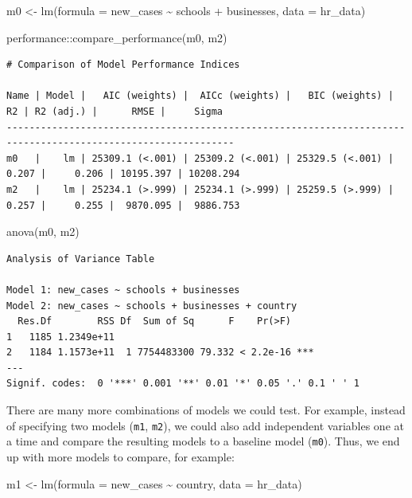 \documentclass[
  letterpaper,
]{krantz}
\makeatletter
\newenvironment{Shaded}{\begin{snugshade}}{\end{snugshade}}
\newcommand{\AttributeTok}[1]{\textcolor[rgb]{0.40,0.45,0.13}{#1}}
\newcommand{\FunctionTok}[1]{\textcolor[rgb]{0.28,0.35,0.67}{#1}}
\newcommand{\NormalTok}[1]{\textcolor[rgb]{0.00,0.23,0.31}{#1}}
\newcommand{\OtherTok}[1]{\textcolor[rgb]{0.00,0.23,0.31}{#1}}
\newcommand{\SpecialCharTok}[1]{\textcolor[rgb]{0.37,0.37,0.37}{#1}}
\newenvironment{kframe}{%
\medskip{}
\setlength{\fboxsep}{.8em}
 \def\at@end@of@kframe{}%
 \ifinner\ifhmode%
  \def\at@end@of@kframe{\end{minipage}}%
  \begin{minipage}{\columnwidth}%
 \fi\fi%
 \def\FrameCommand##1{\hskip\@totalleftmargin \hskip-\fboxsep
 \colorbox{shadecolor}{##1}\hskip-\fboxsep
     \hskip-\linewidth \hskip-\@totalleftmargin \hskip\columnwidth}%
 \MakeFramed {\advance\hsize-\width
   \@totalleftmargin\z@ \linewidth\hsize
   \@setminipage}}%
 {\par\unskip\endMakeFramed%
 \at@end@of@kframe}
\renewenvironment{Shaded}{\begin{kframe}}{\end{kframe}}
\makeatother
\begin{document}
\begin{Shaded}
\begin{Highlighting}[]
\NormalTok{m0 }\OtherTok{\textless{}{-}} \FunctionTok{lm}\NormalTok{(}\AttributeTok{formula =}\NormalTok{ new\_cases }\SpecialCharTok{\textasciitilde{}}
\NormalTok{           schools }\SpecialCharTok{+}
\NormalTok{           businesses,}
         \AttributeTok{data =}\NormalTok{ hr\_data)}

\NormalTok{performance}\SpecialCharTok{::}\FunctionTok{compare\_performance}\NormalTok{(m0, m2)}
\end{Highlighting}
\end{Shaded}

\begin{verbatim}
# Comparison of Model Performance Indices

Name | Model |   AIC (weights) |  AICc (weights) |   BIC (weights) |    R2 | R2 (adj.) |      RMSE |     Sigma
--------------------------------------------------------------------------------------------------------------
m0   |    lm | 25309.1 (<.001) | 25309.2 (<.001) | 25329.5 (<.001) | 0.207 |     0.206 | 10195.397 | 10208.294
m2   |    lm | 25234.1 (>.999) | 25234.1 (>.999) | 25259.5 (>.999) | 0.257 |     0.255 |  9870.095 |  9886.753
\end{verbatim}

\begin{Shaded}
\begin{Highlighting}[]
\FunctionTok{anova}\NormalTok{(m0, m2)}
\end{Highlighting}
\end{Shaded}

\begin{verbatim}
Analysis of Variance Table

Model 1: new_cases ~ schools + businesses
Model 2: new_cases ~ schools + businesses + country
  Res.Df        RSS Df  Sum of Sq      F    Pr(>F)    
1   1185 1.2349e+11                                   
2   1184 1.1573e+11  1 7754483300 79.332 < 2.2e-16 ***
---
Signif. codes:  0 '***' 0.001 '**' 0.01 '*' 0.05 '.' 0.1 ' ' 1
\end{verbatim}

There are many more combinations of models we could test. For example,
instead of specifying two models (\texttt{m1}, \texttt{m2}), we could
also add independent variables one at a time and compare the resulting
models to a baseline model (\texttt{m0}). Thus, we end up with more
models to compare, for example:

\label{four-hierarchical-regressions-nested}
m1 \textless- lm(formula = new\_cases \textasciitilde{} country, data =
hr\_data)
\end{document}
